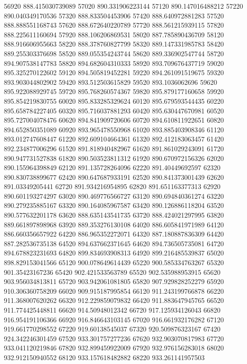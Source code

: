{56920 888.415030739089
57020 890.331906223144
57120 890.147016488212
57220 890.040349170536
57320 888.833504453906
57420 888.640972881283
57520 888.888551168743
57620 888.672640220789
57720 888.561215939115
57820 888.225611160694
57920 888.106206869531
58020 887.785890436709
58120 888.916606955663
58220 888.378760827799
58320 889.147331985783
58420 889.255303376698
58520 889.055354243744
58620 889.336902547744
58720 894.907538147783
58820 894.682604310333
58920 893.709676437719
59020 895.325270122602
59120 894.505819452281
59220 894.261091519675
59320 893.903044802902
59420 893.512503615829
59520 893.1036062696
59620 895.922088929745
59720 895.768260574367
59820 895.879177160658
59920 895.854219830755
60020 895.833285329624
60120 895.679593544435
60220 895.658784227405
60320 895.716037881293
60420 895.630447670981
60520 895.727004078476
60620 894.841909720606
60720 894.610811922651
60820 894.652850351089
60920 893.965478550968
61020 893.885403908346
61120 893.012747608447
61220 892.609104664361
61320 892.412183063457
61420 892.234877006296
61520 891.818940482967
61620 891.861029243091
61720 890.947731527838
61820 890.503523811312
61920 890.670972156326
62020 890.155964398849
62120 891.135728264096
62220 891.40449692597
62320 890.830738899677
62420 890.647687933191
62520 890.841373001439
62620 891.03349205441
62720 891.934216954895
62820 891.651163377313
62920 890.601193274297
63020 890.469776566727
63120 890.694840361274
63220 890.279235885167
63320 890.164085967587
63420 890.126886118204
63520 890.577632201178
63620 888.635143541735
63720 888.424021297995
63820 889.661897898968
63920 889.353276130108
64020 886.605841971989
64120 886.660356657922
64220 886.965352272071
64320 887.180887836309
64420 887.282536735138
64520 894.637662371645
64620 894.736505735081
64720 894.678823231693
64820 899.834693908313
64920 899.216485539837
65020 898.829153041566
65120 900.078649614439
65220 900.585334763267
65320 901.35423167236
65420 902.421533563789
65520 902.535988953915
65620 903.956034813811
65720 903.942061081805
65820 907.929828252279
65920 910.306360758209
66020 909.915187995854
66120 911.243199766878
66220 911.368007620262
66320 912.229859079832
66420 911.883647945765
66520 911.774425448811
66620 914.50948012342
66720 917.125934126043
66820 916.954191106366
66920 916.846643103145
67020 916.661932176282
67120 919.661770298552
67220 919.60138545037
67320 920.509876323167
67420 924.342246301459
67520 933.301757277236
67620 932.903070817983
67720 933.041120219846
67820 932.899459922009
67920 932.976156283018
68020 932.912150940552
68120 933.157618482882
68220 933.261141957503
}
